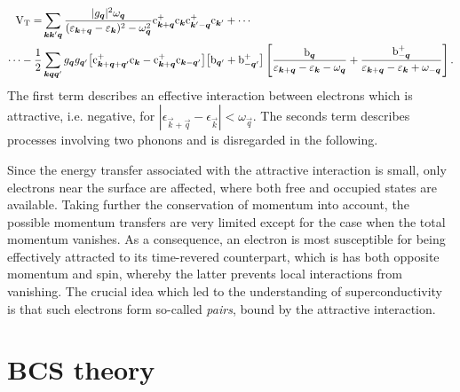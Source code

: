 %
\begin{align*}
    \mathrm V \sb{\text{T}} = &\sum_{\boldsymbol k \boldsymbol k' \boldsymbol q}
    \frac {|g_{\boldsymbol q}|^2 \omega_{\boldsymbol q}}
    {(\varepsilon_{\boldsymbol k + \boldsymbol q} - \varepsilon_{\boldsymbol k})^2 - \omega_{\boldsymbol q}^2}
    \mathrm c_{\boldsymbol k  + \boldsymbol q}^+ \mathrm c_{\boldsymbol k }
    \mathrm c_{\boldsymbol k' - \boldsymbol q}^+ \mathrm c_{\boldsymbol k'} + \cdots
    \\
    \cdots - \frac 1 2 &\sum_{\boldsymbol k \boldsymbol q \boldsymbol q'} g_{\boldsymbol q} g_{\boldsymbol q'}
    \big[ \mathrm c_{\boldsymbol k + \boldsymbol q + \boldsymbol q'}^+ \mathrm c_{\boldsymbol k}
    - \mathrm c_{\boldsymbol k + \boldsymbol q}^+ \mathrm c_{\boldsymbol k - \boldsymbol q'} \big]
    \big[ \mathrm b_{\boldsymbol q'} + \mathrm b_{-\boldsymbol q'}^+ \big] \left[
        \frac {\mathrm b_{\boldsymbol q}}
        {\varepsilon_{\boldsymbol k + \boldsymbol q} - \varepsilon_{\boldsymbol k} - \omega_{\boldsymbol q}}
        + \frac {\mathrm b_{-\boldsymbol q}^+}
        {\varepsilon_{\boldsymbol k + \boldsymbol q} - \varepsilon_{\boldsymbol k} + \omega_{-\boldsymbol q}}
    \right].
\end{align*}
%
The first term describes an effective interaction between electrons which is
attractive, i.e. negative, for $|\epsilon_{\vec k + \vec q} - \epsilon_{\vec k}|
< \omega_{\vec q}$. The seconds term describes processes involving two phonons
and is disregarded in the following.

Since the energy transfer associated with the attractive interaction is small,
only electrons near the  surface are affected, where both free and
occupied states are available. Taking further the conservation of momentum into
account, the possible momentum transfers are very limited except for the case
when the total momentum vanishes. As a consequence, an electron is most
susceptible for being effectively attracted to its time-revered counterpart,
which is has both opposite momentum and spin, whereby the latter prevents local
interactions from vanishing. The crucial idea which led to the understanding of
superconductivity is that such electrons form so-called \emph{
pairs}, bound by the attractive interaction.

\section{BCS theory}


